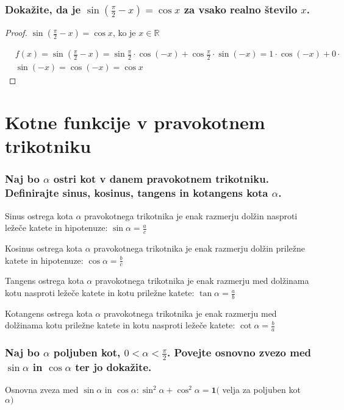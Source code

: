 \documentclass{article}
\begin{document}
\subsubsection*{Dokažite, da je $\sin \left(\frac{\pi}{2}-x\right)=\cos x$ za vsako realno število $x$.}

\begin{proof}
    $\sin \left(\frac{\pi}{2}-x\right)=\cos x$, ko je $x \in \mathbb{R}$

    $$
\begin{aligned}
& f(x)=\sin \left(\frac{\pi}{2}-x\right)=\sin \frac{\pi}{2} \cdot \cos (-x)+\cos \frac{\pi}{2} \cdot \sin (-x)=1 \cdot \cos (-x)+0 \cdot \\
& \sin (-x)=\cos (-x)=\cos x
\end{aligned}
$$
\end{proof}

\section{Kotne funkcije v pravokotnem trikotniku}
\subsubsection*{Naj bo $\alpha$ ostri kot v danem pravokotnem trikotniku. Definirajte sinus, kosinus, tangens in kotangens kota $\alpha$.}

Sinus ostrega kota $\alpha$ pravokotnega trikotnika je enak razmerju dolžin nasproti ležeče katete in hipotenuze: $\sin \alpha=\frac{a}{c}$

Kosinus ostrega kota $\alpha$ pravokotnega trikotnika je enak razmerju dolžin priležne katete in hipotenuze: $\cos \alpha=\frac{b}{c}$

Tangens ostrega kota $\alpha$ pravokotnega trikotnika je enak razmerju med dolžinama kotu nasproti ležeče katete in kotu priležne katete: $\tan \alpha=\frac{a}{b}$

Kotangens ostrega kota $\alpha$ pravokotnega trikotnika je enak razmerju med dolžinama kotu priležne katete in kotu nasproti ležeče katete: $\cot \alpha=\frac{b}{a}$

\subsubsection*{Naj bo $\alpha$ poljuben kot, $0<\alpha<\frac{\pi}{2}$. Povejte osnovno zvezo med $\sin \alpha$ in $\cos \alpha$ ter jo dokažite.}

Osnovna zveza med $\sin \alpha$ in $\cos \alpha: \sin ^{2} \alpha+\cos ^{2} \alpha=\mathbf{1}($ velja za poljuben kot $\alpha)$
\end{document}
